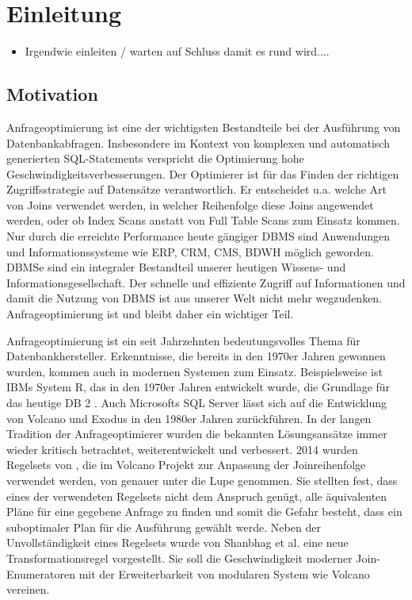 \chapter{Einleitung}

\begin{itemize}
\item Irgendwie einleiten / warten auf Schluss damit es rund wird....
\end{itemize}



\section{Motivation}


Anfrageoptimierung ist eine der wichtigsten Bestandteile bei der Ausführung von Datenbankabfragen. Insbesondere im Kontext von komplexen und automatisch generierten SQL-Statements verspricht die Optimierung hohe Geschwindigkeitsverbesserungen. Der Optimierer ist für das Finden der richtigen Zugriffsstrategie auf Datensätze verantwortlich. Er entscheidet u.a. welche Art von Joins verwendet werden, in welcher Reihenfolge diese Joins angewendet werden, oder ob Index Scans anstatt von Full Table Scans zum Einsatz kommen. Nur durch die erreichte Performance heute gängiger \ac{DBMS} sind Anwendungen und Informationssysteme wie \ac{ERP}, \ac{CRM}, \ac{CMS}, \ac{BDWH} möglich geworden. \ac{DBMS}e sind ein integraler Bestandteil unserer heutigen Wissens- und Informationsgesellschaft. Der schnelle und effiziente Zugriff auf Informationen und damit die Nutzung von \ac{DBMS} ist aus unserer Welt nicht mehr wegzudenken. Anfrageoptimierung ist und bleibt daher ein wichtiger Teil.

Anfrageoptimierung ist ein seit Jahrzehnten bedeutungsvolles Thema für Datenbankhersteller. Erkenntnisse, die bereits in den 1970er Jahren gewonnen wurden, kommen auch in modernen Systemen zum Einsatz. Beispielsweise ist IBMs System R, das in den 1970er Jahren entwickelt wurde, die Grundlage für das heutige DB 2  \cite{wade2012ibm}. Auch Microsofts SQL Server lässt sich auf die Entwicklung von Volcano und Exodus in den 1980er Jahren zurückführen.
In der langen Tradition der Anfrageoptimierer wurden die bekannten Lösungsansätze immer wieder kritisch betrachtet, weiterentwickelt und verbessert. 2014 wurden Regelsets von \cite{pellenkoft1997complexity}, die im Volcano Projekt zur Anpassung der Joinreihenfolge verwendet werden, von \cite{shanbhag2014optimizing} genauer unter die Lupe genommen. 
Sie stellten fest, dass eines der verwendeten Regelsets nicht dem Anspruch genügt, alle äquivalenten Pläne für eine gegebene Anfrage zu finden und somit die Gefahr besteht, dass ein suboptimaler Plan für die Ausführung gewählt werde. Neben der Unvollständigkeit eines Regelsets wurde von Shanbhag et al. eine neue Transformationsregel vorgestellt. Sie soll die Geschwindigkeit moderner Join-Enumeratoren mit der Erweiterbarkeit von modularen System wie Volcano vereinen.

